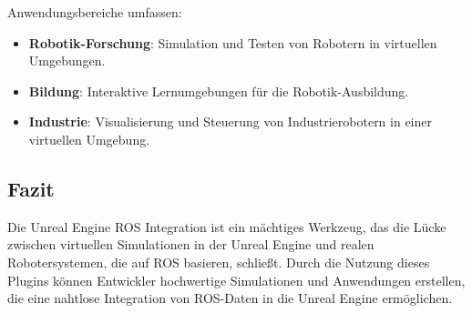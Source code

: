 Anwendungsbereiche umfassen:

\begin{itemize}
    \item \textbf{Robotik-Forschung}: Simulation und Testen von Robotern in virtuellen Umgebungen.
    \item \textbf{Bildung}: Interaktive Lernumgebungen für die Robotik-Ausbildung.
    \item \textbf{Industrie}: Visualisierung und Steuerung von Industrierobotern in einer virtuellen Umgebung.
\end{itemize}

\subsection{Fazit}

Die Unreal Engine ROS Integration ist ein mächtiges Werkzeug, das die Lücke zwischen virtuellen Simulationen in der Unreal Engine und realen Robotersystemen, die auf ROS basieren, schließt. Durch die Nutzung dieses Plugins können Entwickler hochwertige Simulationen und Anwendungen erstellen, die eine nahtlose Integration von ROS-Daten in die Unreal Engine ermöglichen.

